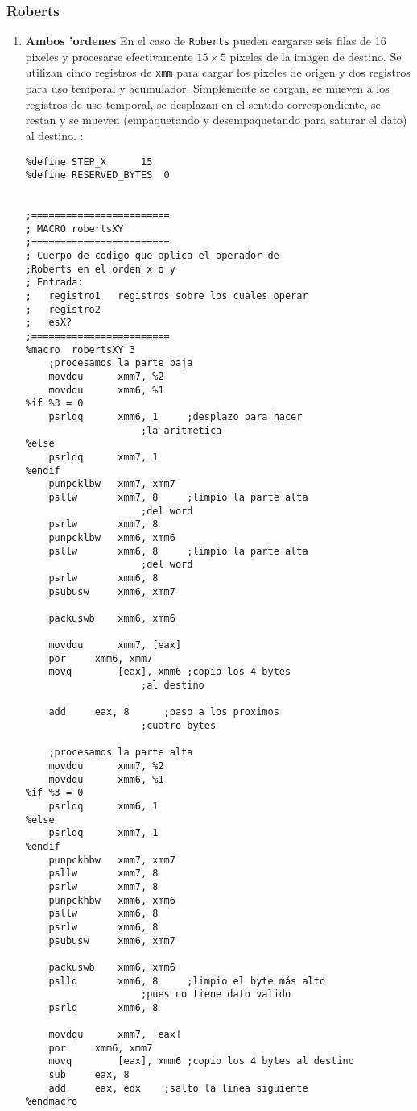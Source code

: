 \documentclass[11pt]{article}
\begin{document}
\subsubsection{Roberts} 
\begin{enumerate}
\item \textbf{Ambos 'ordenes}
\subitem En el caso de \verb'Roberts' pueden cargarse seis filas de 16 pixeles y procesarse efectivamente $15 \times 5$ pixeles de la imagen de destino.  Se utilizan cinco registros de \verb'xmm' para cargar los pixeles de origen y dos registros para uso temporal y acumulador.  Simplemente se cargan, se mueven a los registros de uso temporal, se desplazan en el sentido correspondiente, se restan y se mueven (empaquetando y desempaquetando para saturar el dato) al destino.
:
\begin{lstlisting}[frame=single]
%define REMAINDER	[ebp - 4]
%define	STEP_X		15		
%define RESERVED_BYTES	0


;========================
; MACRO robertsXY
;========================
; Cuerpo de codigo que aplica el operador de 
;Roberts en el orden x o y
; Entrada:
;	registro1	registros sobre los cuales operar 
;	registro2
;	esX?
;========================
%macro	robertsXY 3
	;procesamos la parte baja
	movdqu		xmm7, %2
	movdqu		xmm6, %1
%if %3 = 0
	psrldq		xmm6, 1		;desplazo para hacer 
					;la aritmetica
%else
	psrldq		xmm7, 1
%endif
	punpcklbw	xmm7, xmm7
	psllw		xmm7, 8		;limpio la parte alta 
					;del word
	psrlw		xmm7, 8
	punpcklbw	xmm6, xmm6
	psllw		xmm6, 8		;limpio la parte alta 
					;del word
	psrlw		xmm6, 8
	psubusw		xmm6, xmm7

	packuswb	xmm6, xmm6
	
	movdqu		xmm7, [eax]
	por		xmm6, xmm7
	movq		[eax], xmm6	;copio los 4 bytes 
					;al destino
	
	add		eax, 8		;paso a los proximos 
					;cuatro bytes

	;procesamos la parte alta
	movdqu		xmm7, %2
	movdqu		xmm6, %1
%if %3 = 0
	psrldq		xmm6, 1
%else
	psrldq		xmm7, 1
%endif
	punpckhbw	xmm7, xmm7
	psllw		xmm7, 8
	psrlw		xmm7, 8
	punpckhbw	xmm6, xmm6
	psllw		xmm6, 8
	psrlw		xmm6, 8
	psubusw		xmm6, xmm7

	packuswb	xmm6, xmm6
 	psllq		xmm6, 8		;limpio el byte más alto 
					;pues no tiene dato valido
 	psrlq		xmm6, 8

	movdqu		xmm7, [eax]
	por		xmm6, xmm7
	movq		[eax], xmm6	;copio los 4 bytes al destino
	sub		eax, 8
	add		eax, edx	;salto la linea siguiente
%endmacro
\end{lstlisting}
\end{enumerate}
\end{document}
